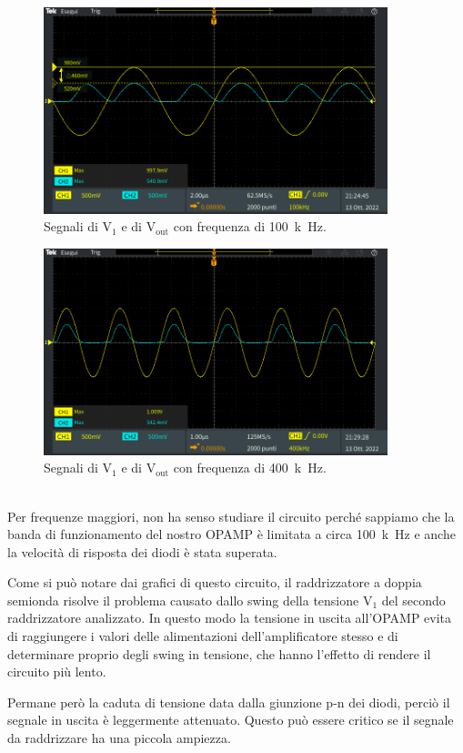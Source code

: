 \documentclass{report}
\begin{document}
\begin{figure}[h!]
	\centering
	\includegraphics[height=6cm]{immagini/TEK00025}
	\caption{Segnali di $\mathrm{V_1}$ e di $\mathrm{V_{out}}$ con frequenza di \SI{100}{k\hertz}.}
	\label{figura:TEK00025}
\end{figure} 
\begin{figure}[h!]
	\centering
	\includegraphics[height=6cm]{immagini/TEK00030}
	\caption{Segnali di $\mathrm{V_1}$ e di $\mathrm{V_{out}}$ con frequenza di \SI{400}{k\hertz}.}
	\label{figura:TEK00030}
\end{figure} 
\\Per frequenze maggiori, non ha senso studiare il circuito perché sappiamo che la banda di funzionamento del nostro OPAMP è limitata a circa \SI{100}{k\hertz} e anche la velocità di risposta dei diodi è stata superata.\par
Come si può notare dai grafici di questo circuito, il raddrizzatore a doppia semionda risolve il problema causato dallo swing della tensione $\displaystyle\mathrm{V_1}$ del secondo raddrizzatore analizzato. In questo modo la tensione in uscita all'OPAMP evita di raggiungere i valori delle alimentazioni dell'amplificatore stesso e di determinare proprio degli swing in tensione, che hanno l'effetto di rendere il circuito più lento.\par 
Permane però la caduta di tensione data dalla giunzione p-n dei diodi, perciò il segnale in uscita è leggermente attenuato. Questo può essere critico se il segnale da raddrizzare ha una piccola ampiezza.

\end{document}
